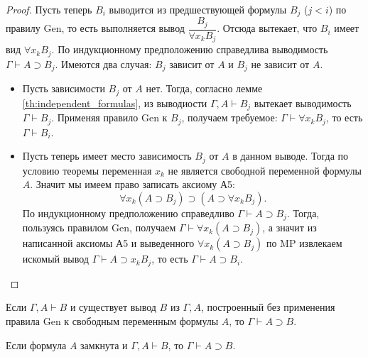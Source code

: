 \begin{proof}
    Пусть теперь $B_i$ выводится из предшествующей формулы $B_j$ ($j < i$) по правилу Gen, то есть выполняется вывод $\dfrac{B_j}{\forall x_kB_j}$. Отсюда вытекает, что $B_i$ имеет вид $\forall x_kB_j$. По индукционному предположению справедлива выводимость $\Gamma \vdash A \supset B_j$. Имеются два случая: $B_j$ зависит от $A$ и $B_j$ не зависит от $A$. 
    \begin{itemize}
        \item Пусть зависимости $B_j$ от $A$ нет. Тогда, согласно лемме \ref{th:independent_formulas}, из выводиости $\Gamma, A \vdash B_j$ вытекает выводимость $\Gamma \vdash B_j$. Применяя правило Gen к $B_j$, получаем требуемое: $\Gamma \vdash \forall x_kB_j$, то есть $\Gamma \vdash B_i$.
        \item Пусть теперь имеет место зависимость $B_j$ от $A$ в данном выводе. Тогда по условию теоремы переменная $x_k$ не является свободной переменной формулы $A$. Значит мы имеем право записать аксиому А5: 
        \[
            \forall x_k(A \supset B_j) \supset (A \supset \forall x_kB_j).
        \]
        По индукционному предположению справедливо $\Gamma \vdash A \supset B_j$. Тогда, пользуясь правилом Gen, получаем $\Gamma \vdash \forall x_k(A \supset B_j)$, а значит из написанной аксиомы А5 и выведенного $\forall x_k(A \supset B_j)$ по MP извлекаем искомый вывод $\Gamma \vdash A \supset x_kB_j$, то есть $\Gamma \vdash A \supset B_i$.
    \end{itemize}
     
\end{proof}

\begin{corollary}
    Если $\Gamma, A \vdash B$ и существует вывод $B$ из $\Gamma, A$, построенный без применения правила Gen к свободным переменным формулы $A$, то $\Gamma \vdash A \supset B$.
\end{corollary}

\begin{corollary}
    Если формула $A$ замкнута и $\Gamma, A \vdash B$, то $\Gamma \vdash A \supset B$.
\end{corollary}


